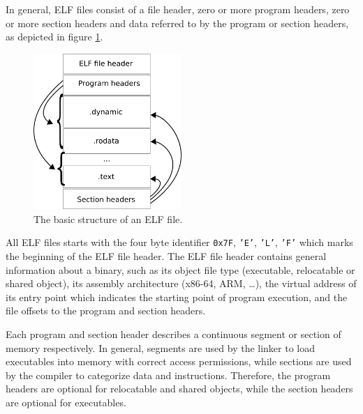 In general, ELF files consist of a file header, zero or more program headers, zero or more section headers and data referred to by the program or section headers, as depicted in figure \ref{fig:elf_file_structure}.

\begin{figure}[htbp]
	\begin{center}
		\includegraphics[width=0.5\textwidth]{inc/2_lit_review/elf_file_structure.png}
		\caption{The basic structure of an ELF file.\protect\footnotemark}
		\label{fig:elf_file_structure}
	\end{center}
\end{figure}

All ELF files starts with the four byte identifier \texttt{0x7F}, \texttt{'E'}, \texttt{'L'}, \texttt{'F'} which marks the beginning of the ELF file header. The ELF file header contains general information about a binary, such as its object file type (executable, relocatable or shared object), its assembly architecture (x86-64, ARM, …), the virtual address of its entry point which indicates the starting point of program execution, and the file offsets to the program and section headers.

Each program and section header describes a continuous segment or section of memory respectively. In general, segments are used by the linker to load executables into memory with correct access permissions, while sections are used by the compiler to categorize data and instructions. Therefore, the program headers are optional for relocatable and shared objects, while the section headers are optional for executables.

